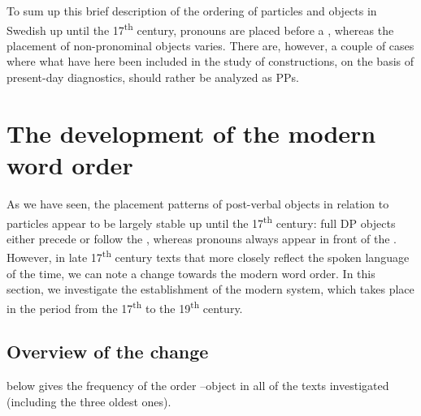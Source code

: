 \documentclass[output=paper]{langscibook}
\begin{document}
To sum up this brief description of the ordering of particles and objects in Swedish up until the 17\textsuperscript{th} century, pronouns are placed before a , whereas the placement of non-pronominal objects varies. There are, however, a couple of cases where what have here been included in the study of  constructions, on the basis of present-day diagnostics, should rather be analyzed as PPs. 


\section{The development of the modern word order}\label{sec:lalu:5}


As we have seen, the placement patterns of post-verbal objects in relation to particles appear to be largely stable up until the 17\textsuperscript{th} century: full DP objects either precede or follow the , whereas pronouns always appear in front of the . However, in late 17\textsuperscript{th} century texts that more closely reflect the spoken language of the time, we can note a change towards the modern word order. In this section, we investigate the establishment of the modern system, which takes place in the period from the 17\textsuperscript{th} to the 19\textsuperscript{th} century.


\subsection{Overview of the change}\label{sec:lalu:5.1}

 below gives the frequency of the order –object in all of the texts investigated (including the three oldest ones).
\end{document}
